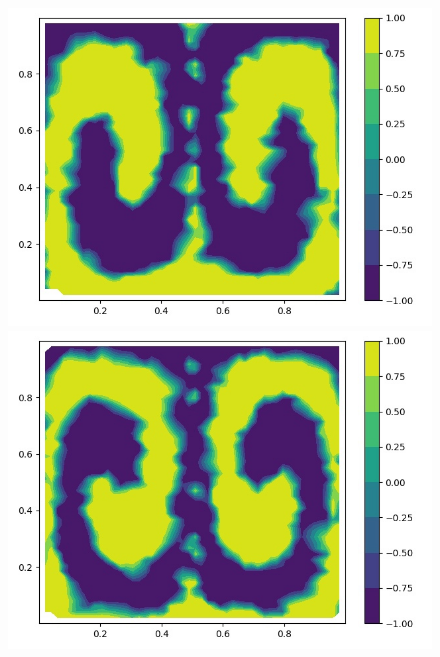 \documentclass[a4paper, 14pt]{extarticle}
\begin{document}
		\begin{figure}[H]
			\begin{minipage}{0.5\textwidth}
				\centering
				\includegraphics[width = \linewidth]{5.jpg}
			\end{minipage}\hfill
			\begin{minipage}{0.5\textwidth}
				\centering
				\includegraphics[width = \linewidth]{6.jpg}
			\end{minipage}\hfill
		\end{figure}
	
\end{document}
